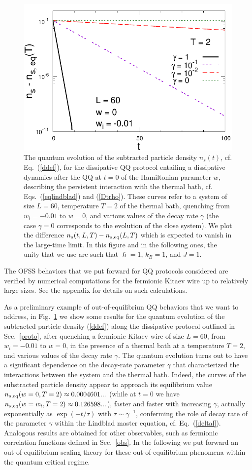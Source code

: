 \begin{figure}[!htb]
\centering
  \includegraphics[width=0.6\columnwidth]{imm/NT2l60diffglog.pdf}
  \caption{The quantum evolution of the subtracted particle density
    $n_s(t)$, cf. Eq.~(\ref{ddef}), for the dissipative QQ protocol
    entailing a dissipative dynamics after the QQ at $t=0$ of the
    Hamiltonian parameter $w$, describing the persistent interaction
    with the thermal bath, cf.  Eqs.~(\ref{eqlindblad}) and
    (\ref{Dtrho}).  These curves refer to a system of size $L=60$,
    temperature $T=2$ of the thermal bath, quenching from $w_i=-0.01$
    to $w=0$, and various values of the decay rate $\gamma$ (the case
    $\gamma=0$ corresponds to the evolution of the close system).  We
    plot the difference $n_s(t,L,T) - n_{s,{\rm eq}}(L,T)$ which is
    expected to vanish in the large-time limit.  In this figure and in
    the following ones, the unity that we use are such that
    $\hslash=1$, $k_B=1$, and $J=1$.}
  \label{plainns}
\end{figure}



The OFSS behaviors that we put forward for QQ protocols considered are
verified by numerical computations for the fermionic Kitaev wire up to
relatively large sizes. See the appendix for details on such
calculations.

As a preliminary example of out-of-equilibriun QQ
behaviors that we want to address, in Fig.~\ref{plainns} we show some
results for the quantum evolution of the subtracted particle density
(\ref{ddef}) along the dissipative protocol outlined in
Sec.~\ref{proto}, after quenching a fermionic Kitaev wire of size
$L=60$, from $w_i=-0.01$ to $w=0$, in the presence of a thermal bath
at a temperature $T=2$, and various values of the decay rate $\gamma$.
The quantum evolution turns out to have a significant dependence on
the decay-rate parameter $\gamma$ that characterized the interactions
between the system and the thermal bath. Indeed, the curves of the
substracted particle density appear to approach its equilibrium value
$n_{s,{\rm eq}}(w=0,T=2)\approx 0.0004601...$ (while at $t=0$ we have
$n_{s,{\rm eq}}(w=w_i,T=2) \approx 0.126598...$), faster and faster
with increasing $\gamma$, actually exponentially as $\exp(-t/\tau)$
with $\tau\sim\gamma^{-1}$, conferming the role of decay rate of the
parameter $\gamma$ within the Lindblad master equation,
cf. Eq.~(\ref{deltal}). Analogous results are obtained for other
observables, such as fermionic correlation functions defined in
Sec.~\ref{obs}. In the following we put forward an out-of-equilibrium
scaling theory for these out-of-equilibrium phenomena within the
quantum critical regime.




